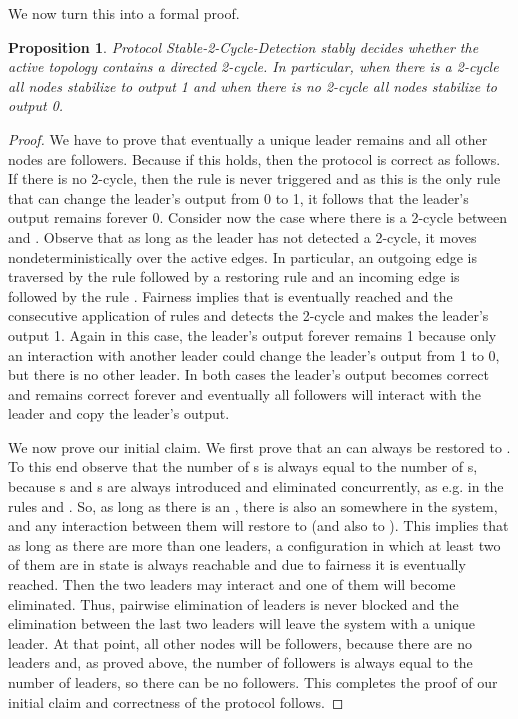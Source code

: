 \documentclass[preprint]{elsarticle}
\newtheorem{proposition}{Proposition}
\begin{document}
We now turn this into a formal proof.

\begin{proposition}
Protocol Stable-2-Cycle-Detection stably decides whether the active topology contains a directed 2-cycle. In particular, when there is a 2-cycle all nodes stabilize to output 1 and when there is no 2-cycle all nodes stabilize to output 0.
\end{proposition}
\begin{proof}
We have to prove that eventually a unique  leader remains and all other nodes are  followers. Because if this holds, then the protocol is correct as follows. If there is no 2-cycle, then the rule  is never triggered and as this is the only rule that can change the leader's output from 0 to 1, it follows that the leader's output remains forever 0.  Consider now the case where there is a 2-cycle between  and . Observe that as long as the leader has not detected a 2-cycle, it moves nondeterministically over the active edges. In particular, an outgoing edge is traversed by the rule  followed by a restoring rule  and an incoming edge is followed by the rule . Fairness implies that  is eventually reached and the consecutive application of rules  and  detects the 2-cycle and makes the leader's output 1. Again in this case, the leader's output forever remains 1 because only an interaction with another leader could change the leader's output from 1 to 0, but there is no other leader. In both cases the leader's output becomes correct and remains correct forever and eventually all followers will interact with the leader and copy the leader's output.

We now prove our initial claim. We first prove that an  can always be restored to . To this end observe that the number of s is always equal to the number of s, because s and s are always introduced and eliminated concurrently, as e.g. in the rules  and . So, as long as there is an , there is also an  somewhere in the system, and any interaction between them will restore  to  (and also  to ). This implies that as long as there are more than one leaders, a configuration in which at least two of them are in state  is always reachable and due to fairness it is eventually reached. Then the two  leaders may interact and one of them will become eliminated. Thus, pairwise elimination of leaders is never blocked and the elimination between the last two leaders will leave the system with a unique  leader. At that point, all other nodes will be  followers, because there are no  leaders and, as proved above, the number of  followers is always equal to the number of  leaders, so there can be no  followers. This completes the proof of our initial claim and correctness of the protocol follows.
\end{proof}
\end{document}
